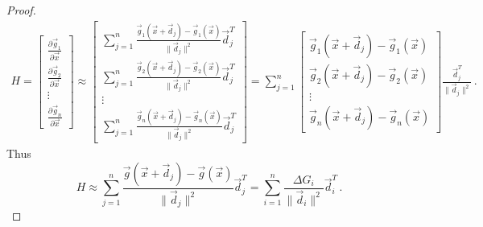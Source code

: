 \begin{proof}
\begin{equation}
\begin{aligned}
 H = \begin{bmatrix} \frac{\partial \vec{g}_1}{\partial \vec{x}}  \\  \frac{\partial \vec{g}_2}{\partial \vec{x}}  \\ \vdots \\ \frac{\partial \vec{g}_n}{\partial \vec{x}} \end{bmatrix} \approx \begin{bmatrix} \sum_{j=1}^n \frac{\vec{g}_1(\vec{x}+\vec{d}_j) - \vec{g}_1 (\vec{x})}{\| \vec{d}_j \|^2} \vec{d}_j^T \\ \sum_{j=1}^n \frac{\vec{g}_2(\vec{x}+\vec{d}_j) - \vec{g}_2 (\vec{x})}{\| \vec{d}_j \|^2} \vec{d}_j^T  \\ \vdots \\ \sum_{j=1}^n \frac{\vec{g}_n(\vec{x}+\vec{d}_j) - \vec{g}_n (\vec{x})}{\| \vec{d}_j \|^2} \vec{d}_j^T \end{bmatrix} = \sum_{j=1}^n \begin{bmatrix} \vec{g}_1(\vec{x}+\vec{d}_j) - \vec{g}_1 (\vec{x}) \\ \vec{g}_2(\vec{x}+\vec{d}_j) - \vec{g}_2 (\vec{x}) \\ \vdots \\ \vec{g}_n(\vec{x}+\vec{d}_j) - \vec{g}_n (\vec{x}) \end{bmatrix} \frac{\vec{d}_j^T}{\| \vec{d}_j \|^2}\,.
\end{aligned}
\end{equation} 
Thus
$$ H \approx \sum_{j=1}^n \frac{\vec{g}(\vec{x}+\vec{d}_j) - \vec{g}(\vec{x}) }{\| \vec{d}_j \|^2} \vec{d}_j^T = \sum_{i=1}^n \frac{\Delta G_i}{\| \vec{d}_i \|^2} \vec{d}_i^T \,.$$
\end{proof}

